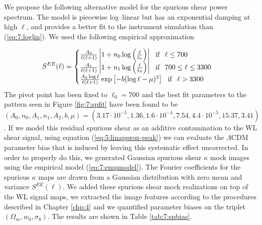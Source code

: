 %
We propose the following alternative model for the spurious shear power spectrum. The model is piecewise log--linear but has an exponential damping at high $\ell$, and provides a better fit to the instrument simulation than (\ref{eq:7:loglin}). We used the following empirical approximation

\begin{equation}
\label{eq:7:empmodel}
S^{EE}(\ell) = 
\begin{cases}
\frac{A_0}{\ell(\ell+1)}\left\vert1+n_0\log\left(\frac{\ell}{\ell_0}\right)\right\vert \,\,\,\,  {\rm if } \,\,\,\, \ell\leq 700 \\
\frac{A_1}{\ell(\ell+1)}\left\vert1+n_1\log\left(\frac{\ell}{\ell_0}\right)\right\vert \,\,\,\,  {\rm if } \,\,\,\, 700\leq\ell\leq 3300 \\
\frac{A_2\log{\ell}}{\ell(\ell+1)}\exp\left[-b(\log{\ell}-\mu)^2\right] \,\,\,\,  {\rm if } \,\,\,\, \ell > 3300
\end{cases} 
\end{equation}
%
The pivot point has been fixed to $\ell_0=700$ and the best fit parameters to the pattern seen in Figure \ref{fig:7:spfit} have been found to be $(A_0,n_0,A_1,n_1,A_2,b,\mu)=(3.17\cdot 10^{-5},1.36,1.6\cdot 10^{-4},7.54,4.4\cdot 10^{-5},15.37,3.41)$. If we model this residual spurious shear as an additive contamination to the WL shear signal, using equation (\ref{eq:5:linapprox-peak}) we can evaluate the $\Lambda$CDM parameter bias that is induced by leaving this systematic effect uncorrected. In order to properly do this, we generated Gaussian spurious shear $\kappa$ mock images using the empirical model (\ref{eq:7:empmodel}). The Fourier coefficients for the spurious $\kappa$ maps are drawn from a Gaussian distribution with zero mean and variance $S^{EE}(\ell)$. We added these spurious shear mock realizations on top of the WL signal maps, we extracted the image features according to the procedures described in Chapter \ref{chp:4} and we quantified parameter biases on the triplet $(\Omega_m,w_0,\sigma_8)$. The results are shown in Table \ref{tab:7:spbias}.
%
